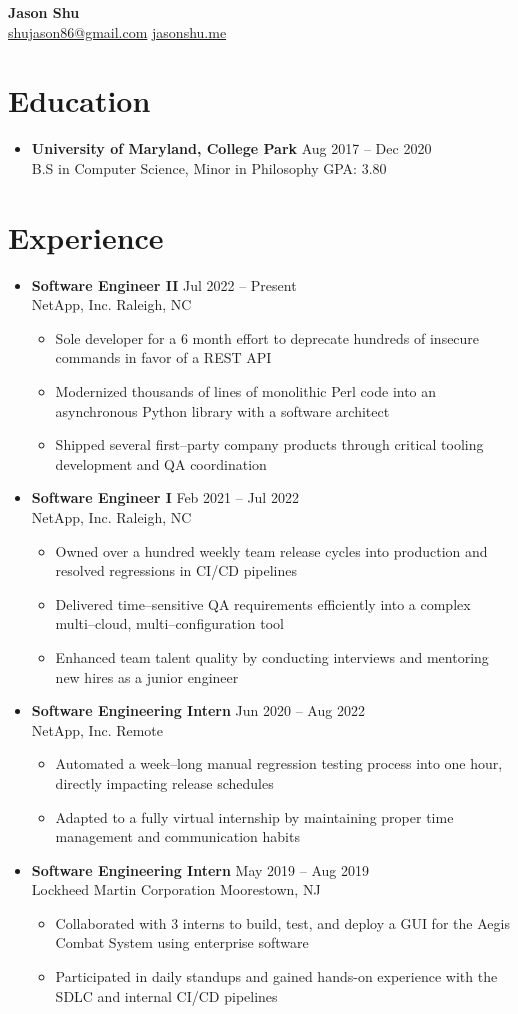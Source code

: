 \documentclass[letterpaper,11pt]{article}
\newcommand{\sectionStart}{\begin{itemize}[leftmargin=0in, label={}]}
\newcommand{\sectionEnd}{\end{itemize}\vspace{-8pt}}
\newcommand{\doubleHeading}[4]{
  \item
    \textbf{#1} \hspace*{\fill} #2 \\
    #3          \hspace*{\fill} #4 \\
    \vspace{-6pt} %
}
\newcommand{\itemListStart}{\begin{itemize}}
\newcommand{\itemListEnd}{\end{itemize}\vspace{-12pt}}
\newcommand{\resumeItem}[1]{
  \item
    \small #1
    \vspace{-3pt} %
}
\begin{document}
  \begin{center}
    \textbf{\Large Jason Shu} \\ \vspace{1pt}
    \footnotesize
      \href{mailto:shujason86@gmail.com}{shujason86@gmail.com}
      \href{https://jasonshu.me}{jasonshu.me}
  \end{center}
  \vspace{-20pt}

  \section{Education}
    \sectionStart
      \doubleHeading{University of Maryland, College Park}{Aug 2017 -- Dec 2020}{B.S in Computer Science, Minor in Philosophy}{GPA: 3.80}
    \sectionEnd
    \vspace{4pt} %

  \section{Experience}
    \sectionStart
      \doubleHeading{Software Engineer II}{Jul 2022 -- Present}{NetApp, Inc.}{Raleigh, NC}
        \itemListStart
          \resumeItem{Sole developer for a 6 month effort to deprecate hundreds of insecure commands in favor of a REST API}               %
          \resumeItem{Modernized thousands of lines of monolithic Perl code into an asynchronous Python library with a software architect} %
          \resumeItem{Shipped several first--party company products through critical tooling development and QA coordination}              %
        \itemListEnd
      \doubleHeading{Software Engineer I}{Feb 2021 -- Jul 2022}{NetApp, Inc.}{Raleigh, NC}
        \itemListStart
          \resumeItem{Owned over a hundred weekly team release cycles into production and resolved regressions in CI/CD pipelines}  %
          \resumeItem{Delivered time--sensitive QA requirements efficiently into a complex multi--cloud, multi--configuration tool} %
          \resumeItem{Enhanced team talent quality by conducting interviews and mentoring new hires as a junior engineer}           %
        \itemListEnd
      \doubleHeading{Software Engineering Intern}{Jun 2020 -- Aug 2022}{NetApp, Inc.}{Remote}
        \itemListStart
          \resumeItem{Automated a week--long manual regression testing process into one hour, directly impacting release schedules} %
          \resumeItem{Adapted to a fully virtual internship by maintaining proper time management and communication habits}         %
        \itemListEnd
      \doubleHeading{Software Engineering Intern}{May 2019 -- Aug 2019}{Lockheed Martin Corporation }{Moorestown, NJ}
        \itemListStart
          \resumeItem{Collaborated with 3 interns to build, test, and deploy a GUI for the Aegis Combat System using enterprise software}
          \resumeItem{Participated in daily standups and gained hands-on experience with the SDLC and internal CI/CD pipelines}
        \itemListEnd
  \sectionEnd
\end{document}
